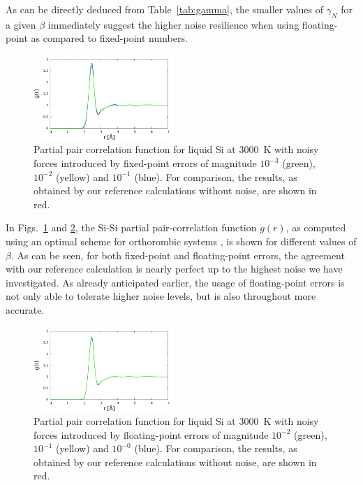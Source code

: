 As can be directly deduced from Table~\ref{tab:gamma}, the smaller values of $\gamma_N$ for a given $\beta$ immediately suggest the higher noise resilience when using floating-point as compared to fixed-point numbers.
\begin{figure}%
\begin{center} 
\includegraphics[width=0.475\textwidth]
{figures/fixedpoint.pdf}
\end{center}
\caption{\label{Fig1}
Partial pair correlation function for liquid Si at 3000~K with noisy forces introduced by fixed-point errors of magnitude $10^{-3}$ (green), $10^{-2}$ (yellow) and $10^{-1}$ (blue). For comparison, the results, as obtained by our reference calculations without noise, are shown in red. 
} \end{figure}
In Figs.~\ref{Fig1} and \ref{Fig2}, the Si-Si partial pair-correlation function $g(r)$, as computed using an optimal scheme for orthorombic systems \cite{KAF}, is shown for different values of $\beta$. %
As can be seen, for both fixed-point and floating-point errors, the agreement with our reference calculation is nearly perfect up to the highest noise we have investigated. As already anticipated earlier, the usage of floating-point errors is not only able to tolerate higher noise levels, but is also throughout more accurate. 
\begin{figure}%
\begin{center}
\includegraphics[width=0.475\textwidth]
{figures/floatingpoint.pdf}
\end{center}
\caption{\label{Fig2}
Partial pair correlation function for liquid Si at 3000~K with noisy forces introduced by floating-point errors of magnitude $10^{-2}$ (green), $10^{-1}$ (yellow) and $10^{-0}$ (blue). For comparison, the results, as obtained by our reference calculations without noise, are shown in red. 
} \end{figure}

